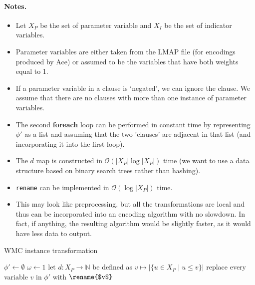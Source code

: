 \documentclass{article}
\theoremstyle{definition}
\theoremstyle{remark}
\begin{document}
\paragraph{Notes.}
\begin{itemize}
\item Let $X_P$ be the set of parameter variable and $X_I$ be the set of
  indicator variables.
\item Parameter variables are either taken from the LMAP file (for encodings
  produced by Ace) or assumed to be the variables that have both weights equal
  to 1.
\item If a parameter variable in a clause is `negated', we can ignore the
  clause. We assume that there are no clauses with more than one instance of
  parameter variables.
\item The second \textbf{foreach} loop can be performed in constant time by
  representing $\phi'$ as a list and assuming that the two 'clauses' are
  adjacent in that list (and incorporating it into the first loop).
\item The $d$ map is constructed in $\mathcal{O}(|X_P|\log|X_P|)$ time (we want
  to use a data structure based on binary search trees rather than hashing).
\item \texttt{rename} can be implemented in $\mathcal{O}(\log |X_P|)$ time.
\item This may look like preprocessing, but all the transformations are local
  and thus can be incorporated into an encoding algorithm with no slowdown. In
  fact, if anything, the resulting algorithm would be slightly faster, as it
  would have less data to output.
\end{itemize}

\begin{algorithm}
  \caption{WMC instance transformation}
  $\phi' \gets \emptyset$\;
  $\omega \gets 1$\;
  let $d\colon X_P \to \mathbb{N}$ be defined as $v \mapsto |\{ u \in X_P \mid u
  \le v \}|$\;
  replace every variable $v$ in $\phi'$ with $\rename{$v$}$\;
  \;
\end{algorithm}
\end{document}
